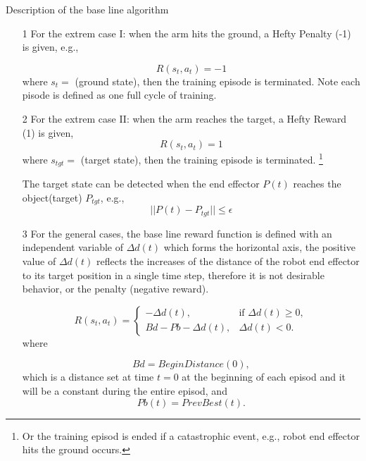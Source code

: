 \documentclass[conference]{IEEEtran}
\begin{document}
Description of the base line algorithm 
\begin{itemize}
\item[1] For the extrem case I: 
when the arm hits the ground, a Hefty Penalty (-1) is 
given, e.g., 

\begin{equation}
R(s_t,a_t) = -1
\end{equation}
where $s_t =$ (ground state),  
then the training episode is terminated. 
Note each pisode is defined as one full cycle of training.

\item[2] For the extrem case II:
when the arm reaches the target, a Hefty Reward (1) 
is given,  
\begin{equation}
R(s_t,a_t) = 1
\end{equation}
where $s_{tgt} =$ (target state), then the training episode is 
terminated. 
\footnote{Or the training episod is ended
if a catastrophic event, e.g., robot 
end effector hits the ground
occurs.} 

The target state can be detected when the end effector 
$P(t)$ 
reaches the object(target) $P_{tgt}$, e.g., 
\begin{equation}
|| P(t) - P_{tgt} || \leq \epsilon
\end{equation}

\item[3] For the general cases, the base line
reward function is defined with an independent 
variable of $\Delta d(t)$ which forms the horizontal axis, 
the positive value of $\Delta d(t)$ reflects the increases 
of the distance of the robot end effector to its target 
position in a single time step, therefore it is not 
desirable behavior, or the penalty (negative reward). 

\begin{equation}
R(s_t,a_t) =
\begin{cases}
    - \Delta d (t), & \text{if $\Delta d (t)\geq 0$},\\
    Bd - Pb - \Delta d(t), & \text{$\Delta d (t)<0 $}.
\end{cases}
\label{eq:baseline_reward1}
\end{equation}
where 

\begin{equation}
Bd = BeginDistance(0) ,
\end{equation}
which is a distance set at 
time $t=0$ at the beginning of each episod and 
it will be a constant during the entire episod, and 
\begin{equation}
Pb (t) = PrevBest(t). 
\end{equation}
\end{itemize} 
 
\end{document}
